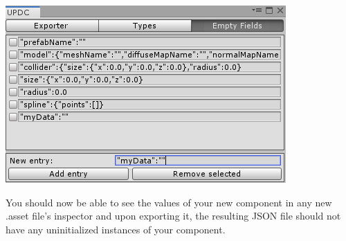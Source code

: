 \documentclass[10pt,a4paper]{article}
\begin{document}
\begin{itemize}
\begin{center}
\includegraphics[scale=1.0]{emptyDefinition}
\end{center}
\end{itemize}
You should now be able to see the values of your new component in any new .asset file's inspector and upon exporting it, the resulting JSON file should not have any uninitialized instances of your component.
\end{document}
